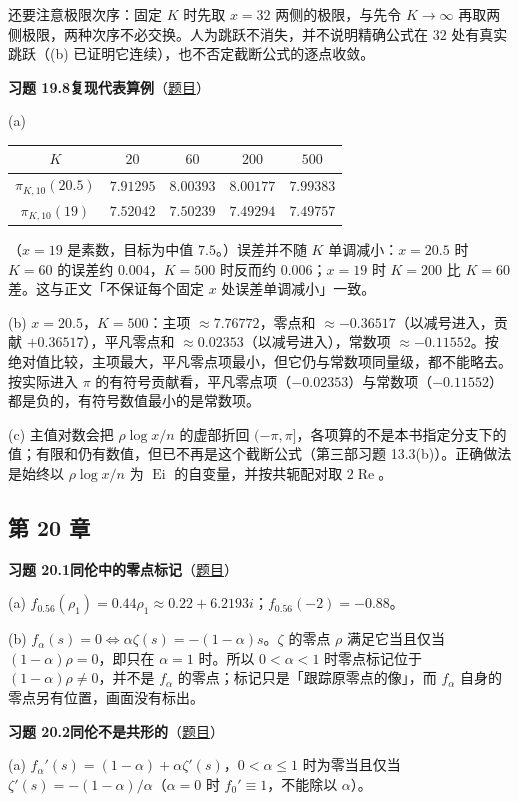 \documentclass[11pt,a4paper]{article}
\DeclareMathOperator{\Ei}{Ei}
\renewcommand{\Re}{\operatorname{Re}}
\newcommand{\Sol}[2]{%
  \par\addvspace{1.2em}\noindent
  \hypertarget{s:#1}{}\textbf{习题 #1\quad #2}\hfill{\small（\hyperlink{q:#1}{题目}）}\par
  \nopagebreak\smallskip}
\begin{document}
还要注意极限次序：固定 $K$ 时先取 $x=32$ 两侧的极限，与先令 $K\to\infty$ 再取两侧极限，两种次序不必交换。人为跳跃不消失，并不说明精确公式在 $32$ 处有真实跳跃（(b) 已证明它连续），也不否定截断公式的逐点收敛。

\Sol{19.8}{复现代表算例}
(a)
\begin{center}
\small
\begin{tabular}{@{}ccccc@{}}
\toprule
$K$ & $20$ & $60$ & $200$ & $500$ \\
\midrule
$\pi_{K,10}(20.5)$ & $7.91295$ & $8.00393$ & $8.00177$ & $7.99383$ \\
$\pi_{K,10}(19)$ & $7.52042$ & $7.50239$ & $7.49294$ & $7.49757$ \\
\bottomrule
\end{tabular}
\end{center}
（$x=19$ 是素数，目标为中值 $7.5$。）误差并不随 $K$ 单调减小：$x=20.5$ 时 $K=60$ 的误差约 $0.004$，$K=500$ 时反而约 $0.006$；$x=19$ 时 $K=200$ 比 $K=60$ 差。这与正文「不保证每个固定 $x$ 处误差单调减小」一致。

(b) $x=20.5$，$K=500$：主项 $\approx7.76772$，零点和 $\approx-0.36517$（以减号进入，贡献 $+0.36517$），平凡零点和 $\approx0.02353$（以减号进入），常数项 $\approx-0.11552$。按绝对值比较，主项最大，平凡零点项最小，但它仍与常数项同量级，都不能略去。按实际进入 $\pi$ 的有符号贡献看，平凡零点项（$-0.02353$）与常数项（$-0.11552$）都是负的，有符号数值最小的是常数项。

(c) 主值对数会把 $\rho\log x/n$ 的虚部折回 $(-\pi,\pi]$，各项算的不是本书指定分支下的值；有限和仍有数值，但已不再是这个截断公式（第三部习题 13.3(b)）。正确做法是始终以 $\rho\log x/n$ 为 $\Ei$ 的自变量，并按共轭配对取 $2\Re$。

\subsection*{第 20 章}

\Sol{20.1}{同伦中的零点标记}
(a) $f_{0.56}(\rho_1)=0.44\rho_1\approx0.22+6.2193i$；$f_{0.56}(-2)=-0.88$。

(b) $f_\alpha(s)=0\iff\alpha\zeta(s)=-(1-\alpha)s$。$\zeta$ 的零点 $\rho$ 满足它当且仅当 $(1-\alpha)\rho=0$，即只在 $\alpha=1$ 时。所以 $0<\alpha<1$ 时零点标记位于 $(1-\alpha)\rho\neq0$，并不是 $f_\alpha$ 的零点；标记只是「跟踪原零点的像」，而 $f_\alpha$ 自身的零点另有位置，画面没有标出。

\Sol{20.2}{同伦不是共形的}
(a) $f_\alpha'(s)=(1-\alpha)+\alpha\zeta'(s)$，$0<\alpha\le1$ 时为零当且仅当 $\zeta'(s)=-(1-\alpha)/\alpha$（$\alpha=0$ 时 $f_0'\equiv1$，不能除以 $\alpha$）。
\end{document}
